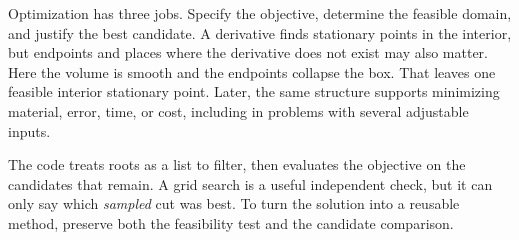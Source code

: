 Optimization has three jobs. Specify the objective, determine the feasible domain, and justify the best candidate. A derivative finds stationary points in the interior, but endpoints and places where the derivative does not exist may also matter. Here the volume is smooth and the endpoints collapse the box. That leaves one feasible interior stationary point. Later, the same structure supports minimizing material, error, time, or cost, including in problems with several adjustable inputs.

The code treats roots as a list to filter, then evaluates the objective on the candidates that remain. A grid search is a useful independent check, but it can only say which \emph{sampled} cut was best. To turn the solution into a reusable method, preserve both the feasibility test and the candidate comparison.


